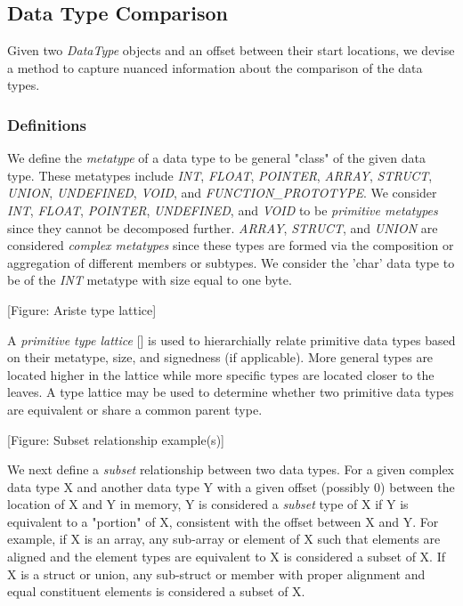 \subsection{Data Type Comparison}

Given two \emph{DataType} objects and an offset between their start locations, we devise a method to capture nuanced information about the comparison of the data types.

\subsubsection{Definitions}

We define the \emph{metatype} of a data type to be general "class" of the given data type. These metatypes include \emph{INT}, \emph{FLOAT}, \emph{POINTER}, \emph{ARRAY}, \emph{STRUCT}, \emph{UNION}, \emph{UNDEFINED}, \emph{VOID}, and \emph{FUNCTION\_PROTOTYPE}. We consider \emph{INT}, \emph{FLOAT}, \emph{POINTER}, \emph{UNDEFINED}, and \emph{VOID} to be \emph{primitive metatypes} since they cannot be decomposed further. \emph{ARRAY}, \emph{STRUCT}, and \emph{UNION} are considered \emph{complex metatypes} since these types are formed via the composition or aggregation of different members or subtypes. We consider the 'char' data type to be of the \emph{INT} metatype with size equal to one byte.

[Figure: Ariste type lattice]

A \emph{primitive type lattice} [] is used to hierarchially relate primitive data types based on their metatype, size, and signedness (if applicable). More general types are located higher in the lattice while more specific types are located closer to the leaves. A type lattice may be used to determine whether two primitive data types are equivalent or share a common parent type.

[Figure: Subset relationship example(s)]

We next define a \emph{subset} relationship between two data types. For a given complex data type X and another data type Y with a given offset (possibly 0) between the location of X and Y in memory, Y is considered a \emph{subset} type of X if Y is equivalent to a "portion" of X, consistent with the offset between X and Y. For example, if X is an array, any sub-array or element of X such that elements are aligned and the element types are equivalent to X is considered a subset of X. If X is a struct or union, any sub-struct or member with proper alignment and equal constituent elements is considered a subset of X.

